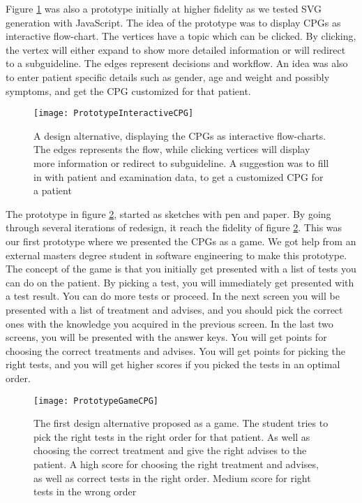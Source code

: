 Figure \ref{fig:PrototypeInteractiveCPG} was also a prototype initially at higher fidelity as we tested SVG generation with JavaScript. The idea of the prototype was to display CPGs as interactive flow-chart. The vertices have a topic which can be clicked. By clicking, the vertex will either expand to show more detailed information or will redirect to a subguideline. The edges represent decisions and workflow. An idea was also to enter patient specific details such as gender, age and weight and possibly symptoms, and get the CPG customized for that patient.


 \begin{figure}[h!]
 	\texttt{[image: PrototypeInteractiveCPG]}
 		\caption {A design alternative, displaying the CPGs as interactive flow-charts. The edges represents the flow, while clicking vertices will display more information or redirect to subguideline. A suggestion was to fill in with patient and examination data, to get a customized CPG for a patient }
 		\label{fig:PrototypeInteractiveCPG}
 \end{figure}

The prototype in figure \ref{fig:PrototypeGameCPG}, started as sketches with pen and paper. By going through several iterations of redesign, it reach the fidelity of figure \ref{fig:PrototypeGameCPG}. This was our first prototype where we presented the CPGs as a game. We got help from an external masters degree student in software engineering to make this prototype. The concept of the game is that you initially get presented with a list of tests you can do on the patient. By picking a test, you will immediately get presented with a test result. You can do more tests or proceed. In the next screen you will be presented with a list of treatment and advises, and you should pick the correct ones with the knowledge you acquired in the previous screen. In the last two screens, you will be presented with the answer keys. You will get points for choosing the correct treatments and advises. You will get points for picking the right tests, and you will get higher scores if you picked the tests in an optimal order.

\begin{figure}[h!]
	\texttt{[image: PrototypeGameCPG]}
	\caption {The first design alternative proposed as a game. The student tries to pick the right tests in the right order for that patient. As well as choosing the correct treatment and give the right advises to the patient. A high score for choosing the right treatment and advises, as well as correct tests in the right order. Medium score for right tests in the wrong order}
	\label{fig:PrototypeGameCPG}
\end{figure}

